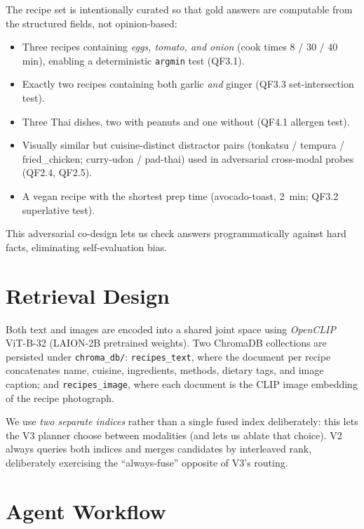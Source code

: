 \documentclass[sigconf, nonacm=true, anonymous=false]{acmart}
\begin{document}
The recipe set is intentionally curated so that gold answers are
computable from the structured fields, not opinion-based:
\begin{itemize}\setlength\itemsep{1pt}
  \item Three recipes containing \emph{eggs, tomato, and onion}
        (cook times 8 / 30 / 40 min), enabling a deterministic
        \texttt{argmin} test (QF3.1).
  \item Exactly two recipes containing both garlic \emph{and} ginger
        (QF3.3 set-intersection test).
  \item Three Thai dishes, two with peanuts and one without (QF4.1
        allergen test).
  \item Visually similar but cuisine-distinct distractor pairs
        (tonkatsu / tempura / fried\_chicken; curry-udon / pad-thai)
        used in adversarial cross-modal probes (QF2.4, QF2.5).
  \item A vegan recipe with the shortest prep time (avocado-toast, 2~min;
        QF3.2 superlative test).
\end{itemize}
This adversarial co-design lets us check answers programmatically against
hard facts, eliminating self-evaluation bias.

\section{Retrieval Design}
\label{sec:retrieval}

Both text and images are encoded into a shared joint space using
\emph{OpenCLIP} ViT-B-32 \cite{openclip} (LAION-2B pretrained weights). Two ChromaDB \cite{chromadb} collections are persisted
under \texttt{chroma\_db/}: \texttt{recipes\_text}, where the document
per recipe concatenates name, cuisine, ingredients, methods, dietary
tags, and image caption; and \texttt{recipes\_image}, where each
document is the CLIP image embedding of the recipe photograph.

We use \emph{two separate indices} rather than a single fused index
deliberately: this lets the V3 planner choose between modalities (and
lets us ablate that choice). V2 always queries both indices and merges
candidates by interleaved rank, deliberately exercising the
``always-fuse'' opposite of V3's routing.

\section{Agent Workflow}
\label{sec:agent}
\end{document}
